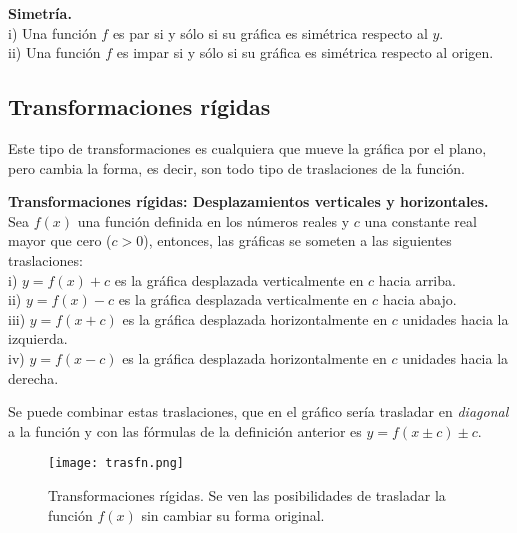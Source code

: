 \begin{mydef}
\textbf{Simetría.}\\
\noindent i) Una función $f$ es par si y sólo si su gráfica es simétrica respecto al $y$. \\
\noindent ii) Una función $f$ es impar si y sólo si su gráfica es simétrica respecto al origen.\\
\end{mydef}

\subsection{Transformaciones rígidas}
Este tipo de transformaciones es cualquiera que mueve la gráfica por el plano, pero cambia la forma, es decir, son todo tipo de traslaciones de la función.\\

\begin{mydef}
\textbf{Transformaciones rígidas: Desplazamientos verticales y horizontales.} Sea $f(x)$ una función definida en los números reales y $c$ una constante real mayor que cero ($c>0$), entonces, las gráficas se someten a las siguientes traslaciones:\\

\noindent i) $y=f(x)+c$ es la gráfica desplazada verticalmente en $c$ hacia arriba.\\

\noindent ii) $y=f(x)-c$ es la gráfica desplazada verticalmente en $c$ hacia abajo.\\

\noindent iii) $y=f(x+c)$ es la gráfica desplazada horizontalmente en $c$ unidades hacia la izquierda.\\

\noindent iv) $y=f(x-c)$ es la gráfica desplazada horizontalmente en $c$ unidades hacia la derecha.\\
\end{mydef}

Se puede combinar estas traslaciones, que en el gráfico sería trasladar en \textit{diagonal} a la función y con las fórmulas de la definición anterior es $y=f(x\pm c)\pm c$.

\begin{center}
\begin{figure}[h!]
\centering
\texttt{[image: trasfn.png]}
\caption[Transformaciones rígidas.]{Transformaciones rígidas. Se ven las posibilidades de trasladar la función $f(x)$ sin cambiar su forma original.}
\label{trasfx}
\end{figure}
\end{center}

